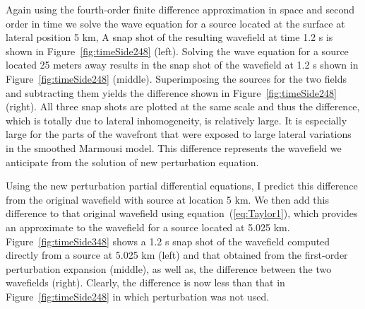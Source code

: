 Again using the fourth-order finite difference approximation in space and second order in time we solve the wave equation for a source
located at the surface at lateral position 5 km, A snap shot of the resulting wavefield at time 1.2 s is shown in
Figure~\ref{fig:timeSide248} (left). Solving the wave equation for a source located 25 meters away results in the snap shot of the
wavefield at 1.2 s shown in Figure~\ref{fig:timeSide248} (middle). Superimposing the sources for the two fields and subtracting them yields the difference
shown in Figure~\ref{fig:timeSide248} (right). All three snap shots are plotted at the same scale  and thus the difference, which is totally due
to lateral inhomogeneity, is relatively large. It is especially large for the parts of the wavefront that were exposed to large lateral variations in 
the smoothed Marmousi model. This difference represents the wavefield we anticipate from the solution of new perturbation equation.

Using the new perturbation partial differential equations, I predict this difference from the original wavefield with source at location 5 km. We then add
  this difference
to that original wavefield using equation~(\ref{eq:Taylor1}), which provides an approximate to the wavefield for a source located at 5.025 km. Figure~\ref{fig:timeSide348} shows
a 1.2 s snap shot of the wavefield computed directly from a source at 5.025 km (left) and that obtained from the first-order perturbation expansion (middle), as well
as, the difference between the two wavefields (right). Clearly, the difference is now less than that in Figure~\ref{fig:timeSide248}  in which perturbation was
not used.

